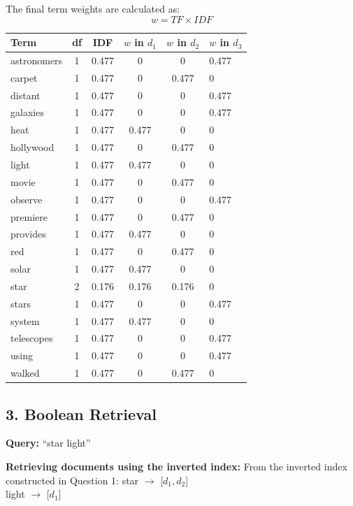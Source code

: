\documentclass{svproc}
\begin{document}
The final term weights are calculated as:
\[ w = TF \times IDF \]

\begin{table}[htbp]
\centering
\begin{tabular}{|l|c|c|c|c|l|}
\hline
\textbf{Term} & \textbf{df} & \textbf{IDF} & \textbf{$w$ in $d_1$} & \textbf{$w$ in $d_2$} & \textbf{$w$ in $d_3$} \\
\hline
astronomers & 1 & 0.477 & 0 & 0 & 0.477 \\
carpet      & 1 & 0.477 & 0 & 0.477 & 0 \\
distant     & 1 & 0.477 & 0 & 0 & 0.477 \\
galaxies    & 1 & 0.477 & 0 & 0 & 0.477 \\
heat        & 1 & 0.477 & 0.477 & 0 & 0 \\
hollywood   & 1 & 0.477 & 0 & 0.477 & 0 \\
light       & 1 & 0.477 & 0.477 & 0 & 0 \\
movie       & 1 & 0.477 & 0 & 0.477 & 0 \\
observe     & 1 & 0.477 & 0 & 0 & 0.477 \\
premiere    & 1 & 0.477 & 0 & 0.477 & 0 \\
provides    & 1 & 0.477 & 0.477 & 0 & 0 \\
red         & 1 & 0.477 & 0 & 0.477 & 0 \\
solar       & 1 & 0.477 & 0.477 & 0 & 0 \\
star        & 2 & 0.176 & 0.176 & 0.176 & 0 \\
stars       & 1 & 0.477 & 0 & 0 & 0.477 \\
system      & 1 & 0.477 & 0.477 & 0 & 0 \\
telescopes  & 1 & 0.477 & 0 & 0 & 0.477 \\
using       & 1 & 0.477 & 0 & 0 & 0.477 \\
walked      & 1 & 0.477 & 0 & 0.477 & 0 \\
\hline
\end{tabular}
\end{table}

\subsection*{3. Boolean Retrieval}
\textbf{Query:} ``star light''

\textbf{Retrieving documents using the inverted index:}
From the inverted index constructed in Question 1:
star $\rightarrow$ [$d_1, d_2$] \\
light $\rightarrow$ [$d_1$]
\end{document}
